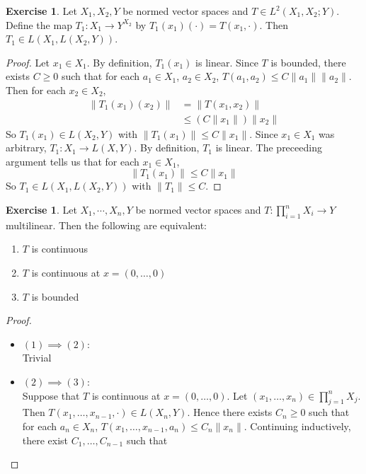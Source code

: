\documentclass[12pt]{amsart}
\theoremstyle{definition}
\newtheorem{ex}[definition]{Exercise}
\begin{document}
	\begin{ex}
	Let $X_1, X_2, Y$ be normed vector spaces and $T \in L^2(X_1, X_2; Y)$. Define the map $T_1 : X_1 \rightarrow  Y^{X_2}$ by  $T_1(x_1)(\cdot) = T(x_1, \cdot)$. Then $T_1 \in L(X_1, L(X_2, Y))$.
	\end{ex}
	
	\begin{proof}
	Let $x_1 \in X_1$. By definition, $T_1(x_1)$ is linear. Since $T$ is bounded, there exists $C \geq 0$ such that for each $a_1 \in X_1$, $a_2 \in X_2$, $T(a_1, a_2) \leq C\|a_1\| \|a_2\|$. Then for each $x_2 \in X_2$,
	\begin{align*}
	\| T_1(x_1)(x_2) \|
	&= \|T(x_1, x_2) \| \\
	&\leq (C\|x_1\|) \|x_2\| 
	\end{align*}
	So $T_1(x_1) \in L(X_2,Y)$ with $\|T_1(x_1)\| \leq C\|x_1\|$. Since $x_1 \in X_1$ was arbitrary, $T_1: X_1 \rightarrow L(X,Y)$. By definition, $T_1$ is linear. The preceeding argument tells us that for each $x_1 \in X_1$, $$\|T_1(x_1)\| \leq C\|x_1\|$$ 
	So $T_1 \in L(X_1, L(X_2, Y))$ with $\|T_1\| \leq C$.  
	\end{proof}		
	
	\begin{ex}
	Let $X_1, \cdots, X_n, Y$ be normed vector spaces and $T: \prod\limits_{i=1}^n X_i \rightarrow Y$ multilinear. Then the following are equivalent:
	\begin{enumerate}
			\item $T$ is continuous
			\item $T$ is continuous at $x=(0, \ldots, 0)$
			\item $T$ is bounded
		\end{enumerate}
	\end{ex}
	
	\begin{proof}\
		\begin{itemize}
		\item $(1) \implies (2)$:\\
		Trivial
		\item $(2) \implies (3)$:\\ Suppose that $T$ is continuous at $x = (0, \ldots, 0)$. Let $(x_1, \ldots, x_n) \in \prod_{j=1}^nX_j$. Then $T(x_1, \ldots, x_{n-1}, \cdot) \in L(X_n, Y)$. Hence there exists $C_n \geq 0$ such that for each $a_n \in X_n$, $T(x_1, \ldots, x_{n-1}, a_n) \leq C_n\|x_n\|$. Continuing inductively, there exist $C_1, \ldots, C_{n-1}$ such that  
		
		\end{itemize}
		
	\end{proof}
	
\end{document}
